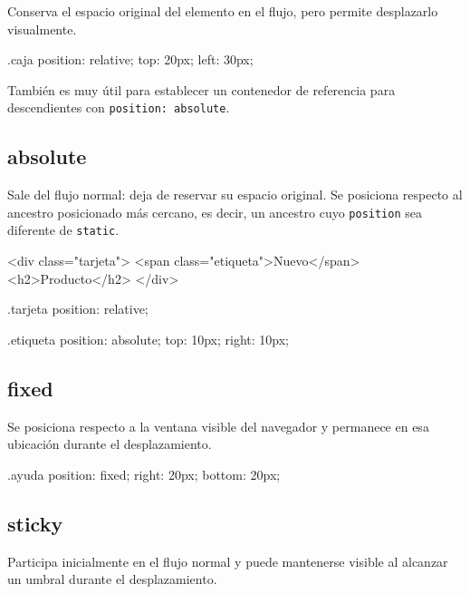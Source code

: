 \documentclass[11pt]{article}
\begin{document}
    Conserva el espacio original del elemento en el flujo, pero permite desplazarlo visualmente.

    \begin{csscodedark}
        .caja {
            position: relative;
            top: 20px;
            left: 30px;
        }
    \end{csscodedark}

    También es muy útil para establecer un contenedor de referencia para descendientes con \texttt{position: absolute}.

    \subsection{absolute}

    Sale del flujo normal: deja de reservar su espacio original. Se posiciona respecto al ancestro posicionado más cercano, es decir, un ancestro cuyo \texttt{position} sea diferente de \texttt{static}.

    \begin{htmlcodedark}
    <div class="tarjeta">
        <span class="etiqueta">Nuevo</span>
        <h2>Producto</h2>
    </div>
    \end{htmlcodedark}

    \begin{csscodedark}
        .tarjeta {
            position: relative;
        }

        .etiqueta {
            position: absolute;
            top: 10px;
            right: 10px;
        }
    \end{csscodedark}

    \subsection{fixed}

    Se posiciona respecto a la ventana visible del navegador y permanece en esa ubicación durante el desplazamiento.

    \begin{csscodedark}
        .ayuda {
            position: fixed;
            right: 20px;
            bottom: 20px;
        }
    \end{csscodedark}

    \subsection{sticky}

    Participa inicialmente en el flujo normal y puede mantenerse visible al alcanzar un umbral durante el desplazamiento.
\end{document}
